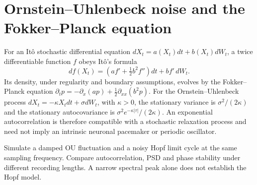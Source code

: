\section{Ornstein--Uhlenbeck noise and the Fokker--Planck equation}
For an It\^o stochastic differential equation
$dX_t=a(X_t)dt+b(X_t)dW_t$, a twice differentiable
function $f$ obeys It\^o's formula
\[
df(X_t)=\left(af'+\tfrac12 b^2f''\right)dt
+b f'\,dW_t.
\]
Its density, under regularity and boundary assumptions,
evolves by the Fokker--Planck equation
$\partial_tp=-\partial_x(ap)
 +\tfrac12\partial_{xx}(b^2p)$.
For the Ornstein--Uhlenbeck process
$dX_t=-\kappa X_tdt+\sigma dW_t$, with $\kappa>0$,
the stationary variance is $\sigma^2/(2\kappa)$ and the
stationary autocovariance is
$\sigma^2e^{-\kappa|\tau|}/(2\kappa)$.
An exponential autocorrelation is therefore compatible with
a stochastic relaxation process and need not imply an intrinsic
neuronal pacemaker or periodic oscillator.

\begin{example}
Simulate a damped OU fluctuation and a noisy Hopf limit cycle
at the same sampling frequency. Compare autocorrelation,
PSD and phase stability under different recording lengths.
A narrow spectral peak alone does not establish the Hopf model.
\end{example}